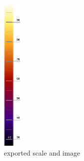 \documentclass[12pt,twoside,a4paper,titlepage]{report}
\begin{document}
\begin{figure}[ht]
 \includegraphics[width=9.5mm, keepaspectratio=true width=10cm]{img/tools_scale_exported_scale}
 \caption{exported scale and image}
 \label{fig:tools-scale-exported}
\end{figure}
\end{document}
